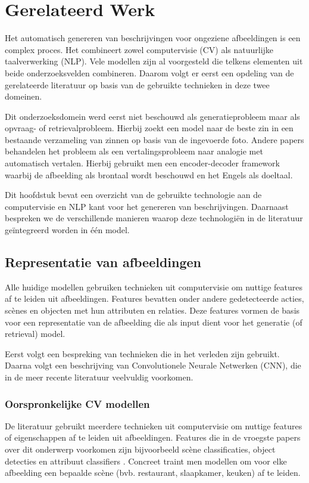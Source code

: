 \chapter{Gerelateerd Werk}
\label{hoofdstuk:related}
Het automatisch genereren van beschrijvingen voor ongeziene afbeeldingen is een complex proces. Het combineert zowel computervisie (CV) als natuurlijke taalverwerking (NLP). Vele modellen zijn al voorgesteld die telkens elementen uit beide onderzoeksvelden combineren. Daarom volgt er eerst een opdeling van de gerelateerde literatuur op basis van de gebruikte technieken in deze twee domeinen. 

Dit onderzoeksdomein werd eerst niet beschouwd als generatieprobleem maar als opvraag- of retrievalprobleem. Hierbij zoekt een model naar de beste zin in een bestaande verzameling van zinnen op basis van de ingevoerde foto.\cite{Hodosh2013} Andere papers behandelen het probleem als een vertalingsprobleem naar analogie met automatisch vertalen. Hierbij gebruikt men een encoder-decoder framework waarbij de afbeelding als brontaal wordt beschouwd en het Engels als doeltaal.

Dit hoofdstuk bevat een overzicht van de gebruikte technologie aan de computervisie en NLP kant voor het genereren van beschrijvingen. Daarnaast bespreken we de verschillende manieren waarop deze technologi\"en in de literatuur ge\"integreerd worden in \'e\'en model.

\section{Representatie van afbeeldingen}
Alle huidige modellen gebruiken technieken uit computervisie om nuttige features af te leiden uit afbeeldingen. Features bevatten onder andere gedetecteerde acties, sc\`enes en objecten met hun attributen en relaties.\cite{Bernardi} Deze features vormen de basis voor een representatie van de afbeelding die als input dient voor het generatie (of retrieval) model. 

Eerst volgt een bespreking van technieken die in het verleden zijn gebruikt. Daarna volgt een beschrijving van Convolutionele Neurale Netwerken (CNN), die in de meer recente literatuur veelvuldig voorkomen.


\subsection{Oorspronkelijke CV modellen}
De literatuur gebruikt meerdere technieken uit computervisie om nuttige features of eigenschappen af te leiden uit afbeeldingen. Features die in de vroegste papers over dit onderwerp voorkomen zijn bijvoorbeeld sc\`ene classificaties, object detecties en attribuut classifiers \cite{Farhadi2010,Yang2011,Patterson2014}. Concreet traint men modellen om voor elke afbeelding een bepaalde sc\`ene (bvb. restaurant, slaapkamer, keuken) af te leiden. 

